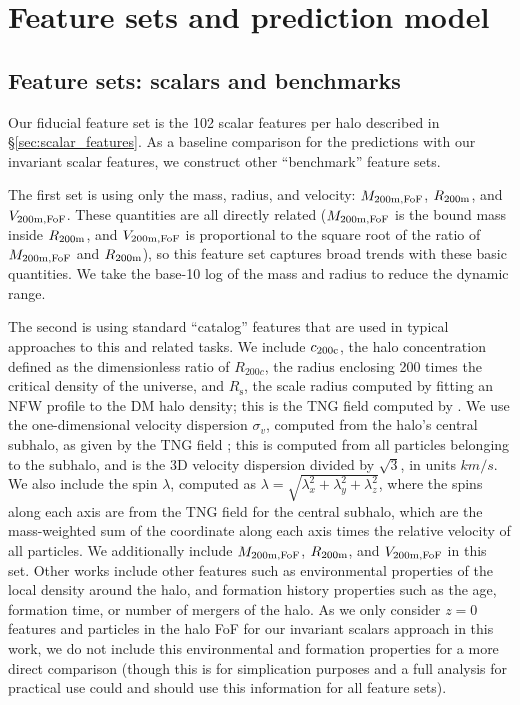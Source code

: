 \section{Feature sets and prediction model}
\label{sec:features_model}

\subsection{Feature sets: scalars and benchmarks}
\label{sec:features}

Our fiducial feature set is the 102 scalar features per halo described in \S\ref{sec:scalar_features}.
As a baseline comparison for the predictions with our invariant scalar features, we construct other ``benchmark'' feature sets.

The first set is using only the mass, radius, and velocity: $M_\mathrm{200m,FoF}$, $R_\mathrm{200m}$, and $V_\mathrm{200m,FoF}$. 
These quantities are all directly related ($M_\mathrm{200m,FoF}$ is the bound mass inside $R_\mathrm{200m}$, and $V_\mathrm{200m,FoF}$ is proportional to the square root of the ratio of $M_\mathrm{200m,FoF}$ and $R_\mathrm{200m}$), so this feature set captures broad trends with these basic quantities.
We take the base-10 log of the mass and radius to reduce the dynamic range.

The second is using standard ``catalog'' features that are used in typical approaches to this and related tasks.
We include $c_\mathrm{200c}$, the halo concentration defined as the dimensionless ratio of $R_{200c}$, the radius enclosing 200 times the critical density of the universe, and $R_\mathrm{s}$, the scale radius computed by fitting an NFW profile to the DM halo density; this is the TNG field  computed by \cite{anbajagane_baryonic_2021}.
We use the one-dimensional velocity dispersion $\sigma_{v}$, computed from the halo's central \dark subhalo, as given by the TNG field ; this is computed from all particles belonging to the subhalo, and is the 3D velocity dispersion divided by $\sqrt{3}$, in units $km/s$.
We also include the spin $\lambda$, computed as $\lambda = \sqrt{\lambda_x^2 + \lambda_y^2 + \lambda_z^2}$, where the spins along each axis are from the TNG field  for the central \dark subhalo, which are the mass-weighted sum of the coordinate along each axis times the relative velocity of all particles.
We additionally include $M_\mathrm{200m,FoF}$, $R_\mathrm{200m}$, and $V_\mathrm{200m,FoF}$ in this set.
Other works include other features such as environmental properties of the local density around the halo, and formation history properties such as the age, formation time, or number of mergers of the halo.
As we only consider $z=0$ features and particles in the halo FoF for our invariant scalars approach in this work, we do not include this environmental and formation properties for a more direct comparison (though this is for simplication purposes and a full analysis for practical use could and should use this information for all feature sets).

